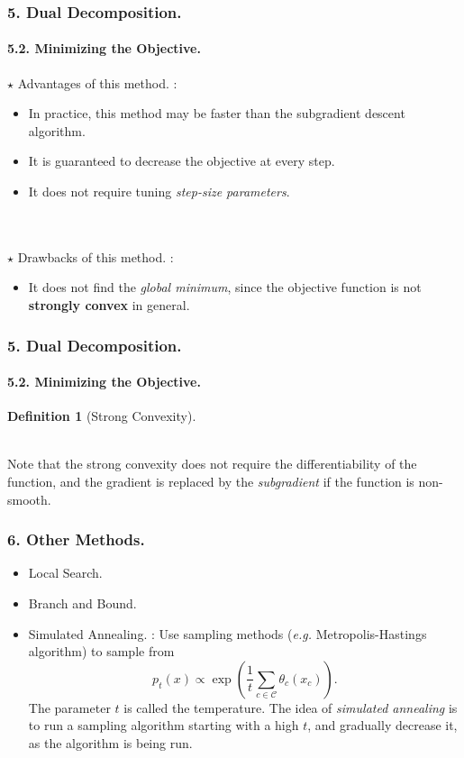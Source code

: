 \documentclass[11pt]{beamer}
\newtheorem*{pf of lemma}{\it Proof of the \normalfont \bf Lemma}
\newtheorem*{pf of claim}{\it Proof of the \normalfont \sf Claim}
\newtheorem{defi}{Definition}[section]
\begin{document}
\begin{frame}
\frametitle{5. Dual Decomposition.}
\framesubtitle{5.2. Minimizing the Objective.}

$\star$ Advantages of this method. :
\begin{itemize}
\item In practice, this method may be faster than the subgradient descent algorithm. \\
\item It is guaranteed to decrease the objective at every step. \\
\item It does not require tuning \textit{step-size parameters}.
\end{itemize}
\ \\ \ \\
$\star$ Drawbacks of this method. :
\begin{itemize}
\item It does not find the \textit{global minimum}, since the objective function is not \textbf{strongly convex} in general.
\end{itemize}

\end{frame}

\begin{frame}
\frametitle{5. Dual Decomposition.}
\framesubtitle{5.2. Minimizing the Objective.}

\begin{defi} [Strong Convexity] 
\end{defi}
\ \\
Note that the strong convexity does not require the differentiability of the function, and the gradient is replaced by the \textit{subgradient} if the function is non-smooth.

\end{frame}

\begin{frame}
\frametitle{6. Other Methods.}

\begin{itemize}
\item Local Search. \\
\item Branch and Bound. \\
\item Simulated Annealing. : Use sampling methods (\textit{e.g.} Metropolis-Hastings algorithm) to sample from 
$$p_{t} (x) \varpropto \exp \left( \frac{1}{t} \sum_{c \in \mathcal{C}} \theta_{c} \left(x_c \right) \right).$$ The parameter $t$ is called the temperature. The idea of \textit{simulated annealing} is to run a sampling algorithm starting with a high $t$, and gradually decrease it, as the algorithm is being run.
\end{itemize}

\end{frame}
\end{document}
